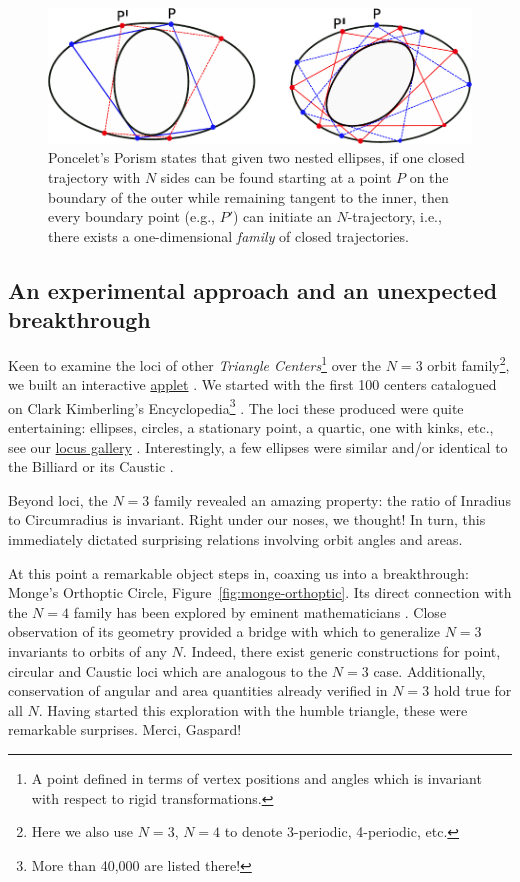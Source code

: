 \begin{figure}
    \centering
    \includegraphics[width=1.0\textwidth]{pics/u0003_poncelet_porism.pdf}
    \caption{Poncelet's Porism states that given two nested ellipses, if one closed trajectory with $N$ sides can be found starting at a point $P$ on the boundary of the outer
while remaining tangent to the inner, then every boundary point (e.g., $P'$) can initiate an $N$-trajectory, i.e., there exists a one-dimensional {\em family} of closed trajectories.}
\label{fig:poncelet-porism}
\end{figure}

\subsection{An experimental approach and an unexpected breakthrough}

Keen to examine the loci of other {\em Triangle Centers}\footnote{A point defined in terms of vertex positions and angles which is invariant with respect to rigid transformations.} over the $N=3$ orbit family\footnote{Here we also use $N=3$, $N=4$ to denote 3-periodic, 4-periodic, etc.}, we built an interactive \href{https://editor.p5js.org/undefined/present/i1Lin7lt7}{applet} \cite{dsr_applet_x12345}. We started with the first 100 centers catalogued on Clark Kimberling's Encyclopedia\footnote{More than 40,000 are listed there!} \cite{etc}. The loci these produced were quite entertaining: ellipses, circles, a stationary point, a quartic, one with kinks, etc., see our \href{https://dan-reznik.github.io/Elliptical-Billiards-Triangular-Orbits/loci_6tri.html}{locus gallery} \cite{reznik_media}. Interestingly, a few ellipses were similar and/or identical to the Billiard or its Caustic \cite{ronaldo19a}. 

Beyond loci, the $N=3$ family revealed an amazing property: the ratio of Inradius to Circumradius is %
invariant. Right under our noses, we thought!
In turn, this immediately dictated surprising relations involving orbit angles and areas.

At this point a remarkable object steps in, coaxing us into a breakthrough: Monge's Orthoptic Circle,  Figure~\ref{fig:monge-orthoptic}. Its direct connection with the $N=4$ family has been explored by eminent mathematicians \cite{connes07}. Close observation of its geometry provided a bridge with which to generalize $N=3$ invariants to orbits of any $N$. Indeed, there exist generic constructions for point, circular and Caustic loci which are analogous to the $N=3$ case. Additionally, conservation of angular and area quantities already verified in $N=3$ hold true for all $N$. Having started this exploration with the humble triangle, these were remarkable surprises. Merci, Gaspard!

